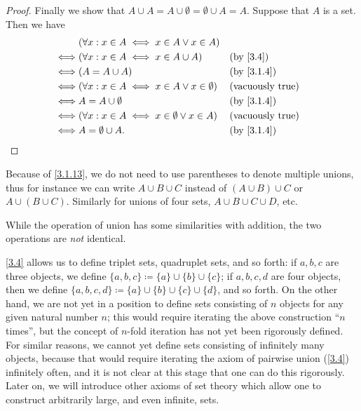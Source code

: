 \begin{proof}
  Finally we show that \(A \cup A = A \cup \emptyset = \emptyset \cup A = A\).
  Suppose that \(A\) is a set.
  Then we have
  \begin{align*}
         & (\forall x : x \in A \iff x \in A \lor x \in A)                                       \\
    \iff & (\forall x : x \in A \iff x \in A \cup A)               &  & \text{(by \cref{3.4})}   \\
    \iff & (A = A \cup A)                                          &  & \text{(by \cref{3.1.4})} \\
    \iff & (\forall x : x \in A \iff x \in A \lor x \in \emptyset) &  & \text{(vacuously true)}  \\
    \iff & A = A \cup \emptyset                                    &  & \text{(by \cref{3.1.4})} \\
    \iff & (\forall x : x \in A \iff x \in \emptyset \lor x \in A) &  & \text{(vacuously true)}  \\
    \iff & A = \emptyset \cup A.                                   &  & \text{(by \cref{3.1.4})}
  \end{align*}
\end{proof}

\begin{note}
  Because of \cref{3.1.13}, we do not need to use parentheses to denote multiple unions, thus for instance we can write \(A \cup B \cup C\) instead of \((A \cup B) \cup C\) or \(A \cup (B \cup C)\).
  Similarly for unions of four sets, \(A \cup B \cup C \cup D\), etc.
\end{note}

\begin{rmk}\label{3.1.14}
  While the operation of union has some similarities with addition, the two operations are \emph{not} identical.
\end{rmk}

\begin{note}
  \cref{3.4} allows us to define triplet sets, quadruplet sets, and so forth: if \(a, b, c\) are three objects, we define \(\{a, b, c\} \coloneqq \{a\} \cup \{b\} \cup \{c\}\);
  if \(a, b, c, d\) are four objects, then we define \(\{a, b, c, d\} \coloneqq \{a\} \cup \{b\} \cup \{c\} \cup \{d\}\), and so forth.
  On the other hand, we are not yet in a position to define sets consisting of \(n\) objects for any given natural number \(n\);
  this would require iterating the above construction ``\(n\) times'', but the concept of \(n\)-fold iteration has not yet been rigorously defined.
  For similar reasons, we cannot yet define sets consisting of infinitely many objects, because that would require iterating the axiom of pairwise union (\cref{3.4}) infinitely often, and it is not clear at this stage that one can do this rigorously.
  Later on, we will introduce other axioms of set theory which allow one to construct arbitrarily large, and even infinite, sets.
\end{note}

